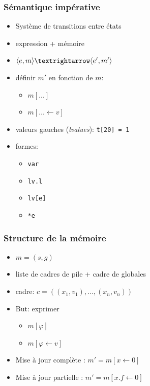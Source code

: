 \documentclass{beamer}
\begin{document}
\begin{frame}
\frametitle{Sémantique impérative}

\begin{itemize}
\item
  Système de transitions entre états
\item
  expression + mémoire
\item
  $\mm{m}{e}{m'}{e'}$
\item
  définir $m'$ en fonction de $m$:

  \begin{itemize}
  \item $m[…]$
  \item $m[… ← v]$
  \end{itemize}
\end{itemize}

\end{frame}

\begin{frame}
    \begin{itemize}
        \item valeurs gauches (\emph{lvalues}): \texttt{t[20] = 1}
        \item formes:
            \begin{itemize}
                \item \texttt{var}
                \item \texttt{lv.l}
                \item \texttt{lv[e]}
                \item \texttt{*e}
            \end{itemize}
    \end{itemize}
\end{frame}

\begin{frame}
\frametitle{Structure de la mémoire}

\begin{itemize}
\item $m = (s, g)$
\item liste de cadres de pile + cadre de globales
\item cadre: $c = ((x_1, v_1), …, (x_n, v_n))$
\item But: exprimer

  \begin{itemize}
  \item $m[φ]$
  \item $m[φ←v]$
  \end{itemize}
\item Mise à jour complète : $m' = m[ x ← 0]$
\item Mise à jour partielle : $m' = m[x.f ← 0]$
\end{itemize}
\end{frame}
\end{document}
